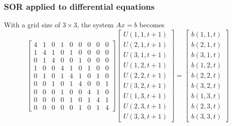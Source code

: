 \begin{frame}
\frametitle{SOR applied to differential equations}
With a grid size of $3\times 3$, the system 
$Ax=b$ becomes
$$
\left[
\begin{array}{ccccccccc}
4 & 1 & 0 & 1 & 0 & 0 & 0 & 0 & 0\\
1 & 4 & 1 & 0 & 1 & 0 & 0 & 0 & 0\\
0 & 1 & 4 & 0 & 0 & 1 & 0 & 0 & 0\\
1 & 0 & 0 & 4 & 1 & 0 & 1 & 0 & 0\\
0 & 1 & 0 & 1 & 4 & 1 & 0 & 1 & 0\\
0 & 0 & 1 & 0 & 1 & 4 & 0 & 0 & 1\\
0 & 0 & 0 & 1 & 0 & 0 & 4 & 1 & 0\\
0 & 0 & 0 & 0 & 1 & 0 & 1 & 4 & 1\\
0 & 0 & 0 & 0 & 0 & 1 & 0 & 1 & 4
\end{array}
\right]
\left[
\begin{array}{c}
U(1,1,t+1) \\
U(2,1,t+1) \\
U(3,1,t+1) \\
U(1,2,t+1) \\
U(2,2,t+1) \\
U(3,2,t+1) \\
U(1,3,t+1) \\
U(2,3,t+1) \\
U(3,3,t+1) 
\end{array}
\right]
=
\left[
\begin{array}{c}
b(1,1,t) \\
b(2,1,t) \\
b(3,1,t) \\
b(1,2,t) \\
b(2,2,t) \\
b(3,2,t) \\
b(1,3,t) \\
b(2,3,t) \\
b(3,3,t) 
\end{array}
\right]
$$
\end{frame}

